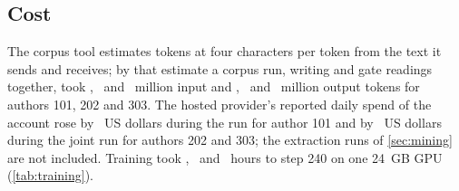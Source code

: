 \begin{table}[t]
\centering\small

\caption{Why writing requests did not keep an essay, by the first gate that turned the draft
away (\cref{sec:corpus}), or because the writing or the gate's reading request failed. An
article was given up after four requests: \CorpusAGivenUp, \CorpusBGivenUp\ and
\CorpusCGivenUp\ of the 60 planned articles.}
\label{tab:rejections}
\end{table}

\subsection{Cost}\label{sec:cost}

The corpus tool estimates tokens at four characters per token from the text it sends and
receives; by that estimate a corpus run, writing and gate readings together, took
\CostInputA, \CostInputB\ and \CostInputC\ million input and \CostOutputA, \CostOutputB\ and
\CostOutputC\ million output tokens for authors 101, 202 and 303. The hosted provider's
reported daily spend of the account rose by \SpendA\ US dollars during the run for author 101
and by \SpendBC\ US dollars during the joint run for authors 202 and 303; the extraction runs
of \cref{sec:mining} are not included. Training took \TrainHoursA, \TrainHoursB\ and
\TrainHoursC\ hours to step 240 on one 24~GB GPU (\cref{tab:training}).
